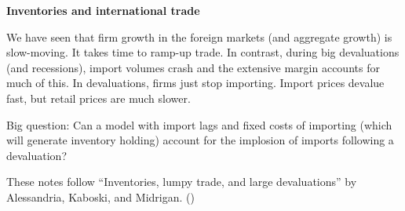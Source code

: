 \documentclass[11pt, pdftex]{article}
\newcommand{\ph}{\phantom}
\begin{document}
\ph{whatever}
\medskip

\centerline{\Large \bf Inventories and international trade}

We have seen that firm growth in the foreign markets (and aggregate growth) is slow-moving. It takes time to ramp-up trade. In contrast, during big devaluations (and recessions), import volumes crash and the extensive margin accounts for much of this. In devaluations, firms just stop importing. Import prices devalue fast, but retail prices are much slower.


Big question: Can a model with import lags and fixed costs of importing (which will generate inventory holding) account for the implosion of imports following a devaluation?

These notes follow ``Inventories, lumpy trade, and large devaluations'' by Alessandria, Kaboski, and Midrigan. (\cite{alessandriaInvetories})
\end{document}
